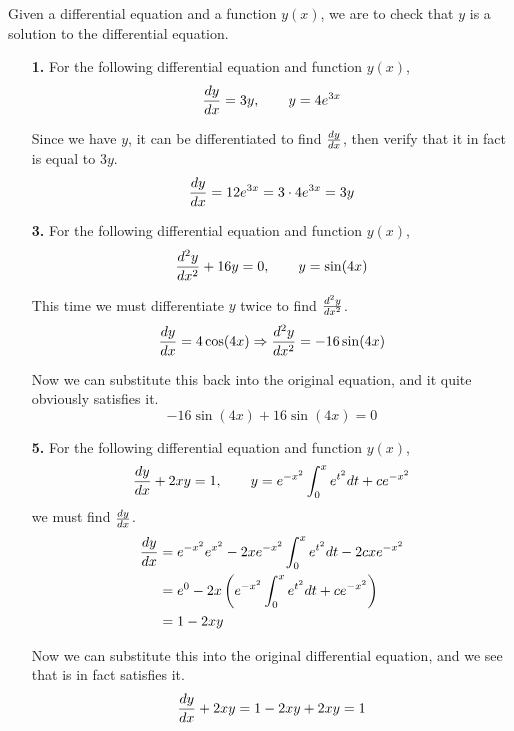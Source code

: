 
Given a differential equation and a function \(y(x)\), we are to check that \(y\) is a solution to the differential equation.
\begin{enumerate}
	\item[\textbf{1.}]
		For the following differential equation and function \(y(x)\),
		\[
			\frac{dy}{dx} = 3y, \qquad y = 4e^{3x}
		\]

		Since we have \(y\), it can be differentiated to find \(\frac{dy}{dx}\), then verify that it in fact is equal to \(3y\).
		\[
			\frac{dy}{dx} = 12e^{3x} = 3 \cdot 4e^{3x} = 3y
		\]

	\item[\textbf{3.}]
		For the following differential equation and function \(y(x)\),
		\[
			\frac{d^2y}{dx^2} + 16y = 0, \qquad y = \sin(4x)
		\]

		This time we must differentiate \(y\) twice to find \(\frac{d^2y}{dx^2}\).
		\[
			\frac{dy}{dx} = 4\cos(4x) \Rightarrow \frac{d^2y}{dx^2} = -16\sin(4x)
		\]

		Now we can substitute this back into the original equation, and it quite obviously satisfies it.
		\[
			-16\sin(4x) + 16\sin(4x) = 0
		\]

	\item[\textbf{5.}]
		For the following differential equation and function \(y(x)\),
		\[
			\frac{dy}{dx} + 2xy = 1, \qquad y = e^{-x^2} \int_0^x e^{t^2} dt + ce^{-x^2}
		\]
		we must find \(\frac{dy}{dx}\).
		\begin{align*}
			\frac{dy}{dx} & = e^{-x^2}e^{x^2} - 2xe^{-x^2} \int_0^x e^{t^2} dt - 2cxe^{-x^2} \\
			      & = e^0 - 2x \left(e^{-x^2} \int_0^x e^{t^2} dt + ce^{-x^2}\right) \\
			      & = 1 - 2xy
		\end{align*}

		Now we can substitute this into the original differential equation, and we see that is in fact satisfies it.
		\[
			\frac{dy}{dx} + 2xy = 1 - 2xy + 2xy = 1
		\]

\end{enumerate}
